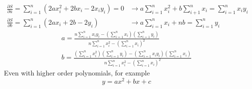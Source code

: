 \documentclass[class=report, crop=false, 12pt,a4paper]{standalone}
\begin{document}
\begin{align}
  \frac{\partial S}{\partial a} = \sum_{i = 1}^n (2 ax_i^2 + 2bx_i - 2x_i y_i) = 0 &\rightarrow a\sum_{i=1}^n x_i^2 + b\sum_{i +1}^n x_i = \sum_{i=1}^n x_i y_i\\
  \frac{\partial S}{\partial b} = \sum_{i=1}^n (2ax_i + 2b - 2y_i) &\rightarrow a\sum_{i=1}^n x_i + nb = \sum_{i=1}^n y_i
\end{align}
\begin{gather}
  a = \frac{n \sum_{i=1}^n x_i y_i - \left(\sum_{i=1}^n x_i\right)\left(\sum_{i=1}^n y_i\right)}{n\sum_{i=1}^n x_i^2 - \left(\sum_{i=1}^n x_i\right)^2}\\
  b = \frac{\left(\sum_{i=1}^n x_i^2\right) \left(\sum_{i=1}^n y_i\right) - \left(\sum_{i=1}^n x_i y_i\right)\left(\sum_{i=1}^n x_i\right)}{n\sum_{i=1}^n x_i^2 - \left(\sum_{i=1}^n x_i\right)^2}
\end{gather}
Even with higher order polynomials, for example
\begin{equation}
  y = ax^2 + bx + c
\end{equation}
\end{document}
